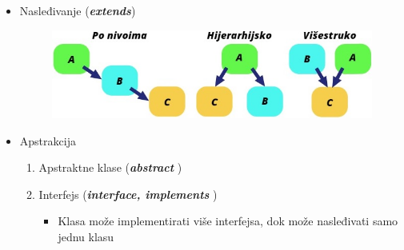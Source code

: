 \documentclass[14pt,aspectratio=169]{beamer}
\begin{document}
\begin{frame}[fragile]
\begin{itemize}

\item Nasleđivanje ({\em\textbf{extends}})
	\begin{figure}[h!]
	\includegraphics[scale=0.7]{slike/nasledjivanje.jpg}
	\end{figure}	
\item Apstrakcija
	\begin{enumerate}
		\item Apstraktne klase ({\em \textbf{abstract}} )
		\item Interfejs ({\em \textbf{interface, implements}} )
		\begin{itemize}
			\item Klasa može implementirati više interfejsa, dok može nasleđivati samo jednu klasu
		\end{itemize}
	\end{enumerate}	
\end{itemize}
\end{frame}
\end{document}
